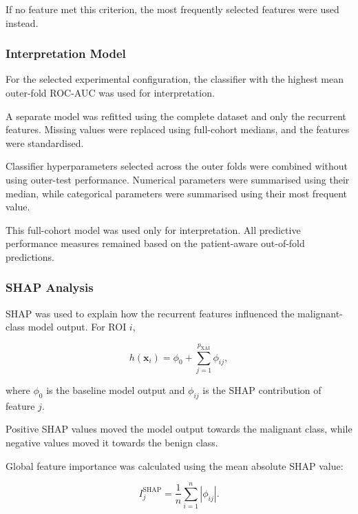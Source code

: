 \documentclass[12pt,twocolumn]{article}
\begin{document}
If no feature met this criterion, the most frequently selected features
were used instead.

\subsubsection{Interpretation Model}
\label{subsubsec:interpretation_model}

For the selected experimental configuration, the classifier with the
highest mean outer-fold ROC-AUC was used for interpretation.

A separate model was refitted using the complete dataset and only the
recurrent features. Missing values were replaced using full-cohort
medians, and the features were standardised.

Classifier hyperparameters selected across the outer folds were
combined without using outer-test performance. Numerical parameters
were summarised using their median, while categorical parameters were
summarised using their most frequent value.

This full-cohort model was used only for interpretation. All predictive
performance measures remained based on the patient-aware out-of-fold
predictions.

\subsubsection{SHAP Analysis}
\label{subsubsec:shap_analysis}

SHAP was used to explain how the recurrent features influenced the
malignant-class model output. For ROI \(i\),

\begin{equation}
h(\mathbf{x}_i)
=
\phi_0
+
\sum_{j=1}^{p_{\mathrm{XAI}}}
\phi_{ij},
\label{eq:shap_additive_representation}
\end{equation}

where \(\phi_0\) is the baseline model output and \(\phi_{ij}\) is the
SHAP contribution of feature \(j\).

Positive SHAP values moved the model output towards the malignant class,
while negative values moved it towards the benign class.

Global feature importance was calculated using the mean absolute SHAP
value:

\begin{equation}
I_j^{\mathrm{SHAP}}
=
\frac{1}{n}
\sum_{i=1}^{n}
\left|
\phi_{ij}
\right|.
\label{eq:mean_absolute_shap}
\end{equation}
\end{document}
